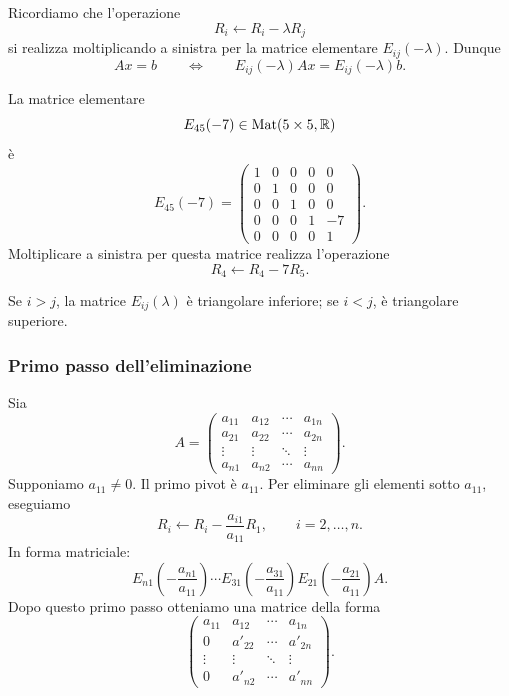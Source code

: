 \documentclass[a4paper]{article}
\begin{document}
Ricordiamo che l'operazione
\[
    R_i \longleftarrow R_i-\lambda R_j
\]
si realizza moltiplicando a sinistra per la matrice elementare \(E_{ij}(-\lambda)\). Dunque
\[
    Ax=b
    \qquad\Longleftrightarrow\qquad
    E_{ij}(-\lambda)Ax=E_{ij}(-\lambda)b.
\]

\begin{snippetexample}{}
    La matrice elementare
    \[
        E_{45}(-7)\in\operatorname{Mat}(5\times 5,\mathbb{R})
    \]
    è
    \[
        E_{45}(-7)=
        \begin{pmatrix}
            1 & 0 & 0 & 0 & 0\\
            0 & 1 & 0 & 0 & 0\\
            0 & 0 & 1 & 0 & 0\\
            0 & 0 & 0 & 1 & -7\\
            0 & 0 & 0 & 0 & 1
        \end{pmatrix}.
    \]
    Moltiplicare a sinistra per questa matrice realizza l'operazione
    \[
        R_4 \longleftarrow R_4-7R_5.
    \]
\end{snippetexample}

Se \(i>j\), la matrice \(E_{ij}(\lambda)\) è triangolare inferiore; se \(i<j\), è triangolare superiore.

\subsubsection{Primo passo dell'eliminazione}

Sia
\[
    A=
    \begin{pmatrix}
        a_{11} & a_{12} & \cdots & a_{1n}\\
        a_{21} & a_{22} & \cdots & a_{2n}\\
        \vdots & \vdots & \ddots & \vdots\\
        a_{n1} & a_{n2} & \cdots & a_{nn}
    \end{pmatrix}.
\]
Supponiamo \(a_{11}\neq 0\). Il primo pivot è \(a_{11}\). Per eliminare gli elementi sotto \(a_{11}\), eseguiamo
\[
    R_i \longleftarrow R_i-\frac{a_{i1}}{a_{11}}R_1,
    \qquad
    i=2,\ldots,n.
\]
In forma matriciale:
\[
    E_{n1}\left(-\frac{a_{n1}}{a_{11}}\right)
    \cdots
    E_{31}\left(-\frac{a_{31}}{a_{11}}\right)
    E_{21}\left(-\frac{a_{21}}{a_{11}}\right)A.
\]
Dopo questo primo passo otteniamo una matrice della forma
\[
    \begin{pmatrix}
        a_{11} & a_{12} & \cdots & a_{1n}\\
        0 & a'_{22} & \cdots & a'_{2n}\\
        \vdots & \vdots & \ddots & \vdots\\
        0 & a'_{n2} & \cdots & a'_{nn}
    \end{pmatrix}.
\]
\end{document}
